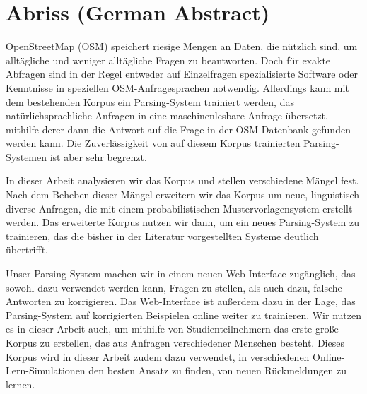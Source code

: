 \chapter{Abriss (German Abstract)}
\label{ch:abstract-german}

OpenStreetMap (OSM) speichert riesige Mengen an Daten, die nützlich sind, um
alltägliche und weniger alltägliche Fragen zu beantworten. Doch für exakte
Abfragen sind in der Regel entweder auf Einzelfragen spezialisierte Software
oder Kenntnisse in speziellen OSM-Anfragesprachen notwendig. Allerdings kann mit
dem bestehenden Korpus \nlmapstwo{} ein Parsing-System trainiert werden, das
natürlichsprachliche Anfragen in eine maschinenlesbare Anfrage übersetzt,
mithilfe derer dann die Antwort auf die Frage in der OSM-Datenbank gefunden
werden kann. Die Zuverlässigkeit von auf diesem Korpus trainierten
Parsing-Systemen ist aber sehr begrenzt.

In dieser Arbeit analysieren wir das Korpus \nlmapstwo{} und stellen
verschiedene Mängel fest. Nach dem Beheben dieser Mängel erweitern wir das
Korpus um neue, linguistisch diverse Anfragen, die mit einem probabilistischen
Mustervorlagensystem erstellt werden. Das erweiterte Korpus nutzen wir dann, um
ein neues Parsing-System zu trainieren, das die bisher in der Literatur
vorgestellten Systeme deutlich übertrifft.

Unser Parsing-System machen wir in einem neuen Web-Interface zugänglich, das
sowohl dazu verwendet werden kann, Fragen zu stellen, als auch dazu, falsche
Antworten zu korrigieren. Das Web-Interface ist außerdem dazu in der Lage, das
Parsing-System auf korrigierten Beispielen online weiter zu trainieren. Wir
nutzen es in dieser Arbeit auch, um mithilfe von Studienteilnehmern das erste
große \nlmaps{}-Korpus zu erstellen, das aus Anfragen verschiedener Menschen
besteht. Dieses Korpus wird in dieser Arbeit zudem dazu verwendet, in
verschiedenen Online-Lern-Simulationen den besten Ansatz zu finden, von neuen
Rückmeldungen zu lernen.

